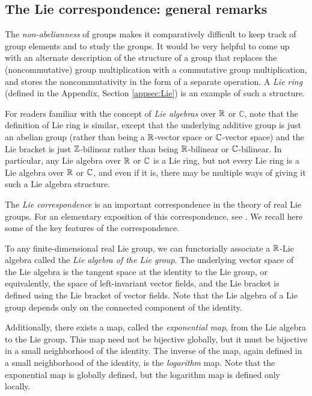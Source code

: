 \subsection{The Lie correspondence: general remarks}\label{sec:lie-correspondence-intro}

The {\em non-abelianness} of groups makes it comparatively difficult
to keep track of group elements and to study the groups. It would be
very helpful to come up with an alternate description of the structure
of a group that replaces the (noncommutative) group multiplication
with a commutative group multiplication, and stores the
noncommutativity in the form of a separate operation. A {\em Lie ring}
(defined in the Appendix, Section \ref{appsec:Lie}) is an example of
such a structure.

For readers familiar with the concept of {\em Lie algebras} over $\mathbb{R}$
or $\mathbb{C}$, note that the definition of Lie ring is similar,
except that the underlying additive group is just an abelian group
(rather than being a $\mathbb{R}$-vector space or $\mathbb{C}$-vector space) and the
Lie bracket is just $\mathbb{Z}$-bilinear rather than being $\mathbb{R}$-bilinear or
$\mathbb{C}$-bilinear. In particular, any Lie algebra over $\mathbb{R}$ or $\mathbb{C}$ is a
Lie ring, but not every Lie ring is a Lie algebra over $\mathbb{R}$ or $\mathbb{C}$,
and even if it is, there may be multiple ways of giving it such a Lie
algebra structure.

The {\em Lie correspondence} is an important correspondence in the
theory of real Lie groups. For an elementary exposition of this
correspondence, see \cite{vsv}. We recall here some of the key
features of the correspondence.

To any finite-dimensional real Lie group, we can functorially
associate a $\mathbb{R}$-Lie algebra called the {\em Lie algebra of the Lie
  group}. The underlying vector space of the Lie algebra is the
tangent space at the identity to the Lie group, or equivalently, the
space of left-invariant vector fields, and the Lie bracket is defined
using the Lie bracket of vector fields. Note that the Lie algebra of a
Lie group depends only on the connected component of the identity.

Additionally, there exists a map, called the {\em exponential map},
from the Lie algebra to the Lie group. This map need not be bijective
globally, but it must be bijective in a small neighborhood of the
identity. The inverse of the map, again defined in a small
neighborhood of the identity, is the {\em logarithm} map. Note that
the exponential map is globally defined, but the logarithm map is
defined only locally.

